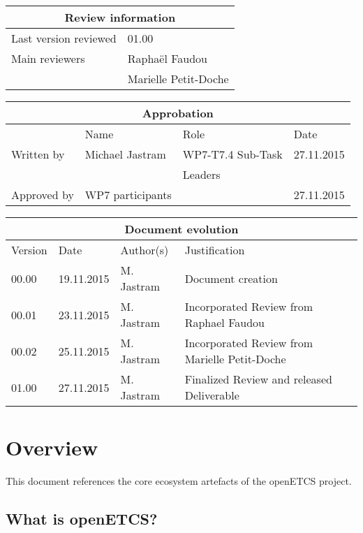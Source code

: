 \documentclass{template/openetcs_report}
\begin{document}
\begin{tabular}{|p{4.4cm}|p{8.7cm}|}
\hline
\multicolumn{2}{|c|}{Review information} \\
\hline
Last version reviewed & 01.00 \\
\hline
Main reviewers & Raphaël Faudou \\
& Marielle Petit-Doche \\
\hline
\end{tabular}

\begin{tabular}{|p{2.2cm}|p{4cm}|p{4cm}|p{2cm}|}
\hline
\multicolumn{4}{|c|}{Approbation} \\
\hline
  &  Name & Role & Date   \\
\hline  
Written by    &  Michael Jastram & WP7-T7.4 Sub-Task  & 27.11.2015 \\
&  & Leaders&\\
\hline
Approved by & WP7 participants &   & 27.11.2015 \\
\hline
\end{tabular}

\begin{tabular}{|p{2.2cm}|p{2cm}|p{3cm}|p{5cm}|}
\hline
\multicolumn{4}{|c|}{Document evolution} \\
\hline
Version &  Date & Author(s) & Justification  \\
\hline  
00.00 & 19.11.2015 & M. Jastram  &  Document creation  \\
00.01 & 23.11.2015 & M. Jastram  &  Incorporated Review from Raphael Faudou  \\
00.02 & 25.11.2015 & M. Jastram  &  Incorporated Review from Marielle Petit-Doche  \\
01.00 & 27.11.2015 & M. Jastram  &  Finalized Review and released Deliverable  \\


\hline  
\end{tabular}
\newpage


\mainmatter
\chapter{Overview}

This document references the core ecosystem artefacts of the openETCS project.

\section{What is openETCS?}
\end{document}
